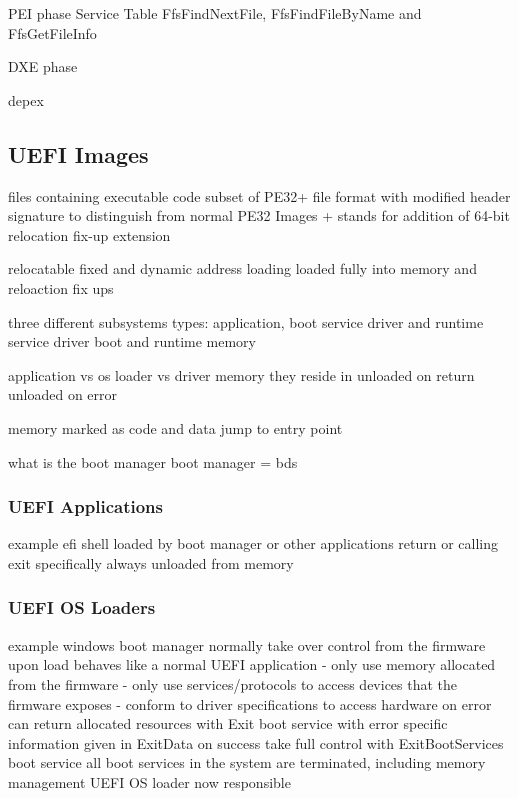 PEI phase Service Table
FfsFindNextFile, FfsFindFileByName and FfsGetFileInfo

DXE phase

depex

\cite{tianocore-edk2-build-spec}

\subsection{\acs{UEFI} Images}

files containing executable code
subset of PE32+ file format with modified header signature to distinguish from normal PE32 Images
+ stands for addition of 64-bit relocation fix-up extension

relocatable
fixed and dynamic address loading
loaded fully into memory and reloaction fix ups

three different subsystems types: application, boot service driver and runtime service driver
boot and runtime memory

application vs os loader vs driver
memory they reside in
unloaded on return
unloaded on error

memory marked as code and data
jump to entry point

what is the boot manager
boot manager = bds

\subsubsection{\acs{UEFI} Applications}

example efi shell
loaded by boot manager or other applications
return or calling exit specifically
always unloaded from memory

\subsubsection{UEFI OS Loaders}

example windows boot manager
normally take over control from the firmware
upon load behaves like a normal UEFI application
- only use memory allocated from the firmware
- only use services/protocols to access devices that the firmware exposes
- conform to driver specifications to access hardware
on error can return allocated resources with Exit boot service with error specific information given in ExitData
on success take full control with ExitBootServices boot service
all boot services in the system are terminated, including memory management
UEFI OS loader now responsible

